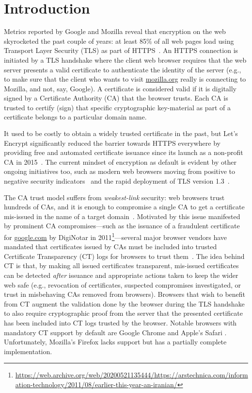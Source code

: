 \section{Introduction} \label{sec:introduction}
Metrics reported by Google and Mozilla reveal that encryption on the web
skyrocketed the past couple of years: at least 85\% of all web pages load using
Transport Layer Security (TLS) as part of
HTTPS~\cite{google-metrics,mozilla-metrics}. An HTTPS connection is initiated by
a TLS handshake where the client web browser requires that the web server
presents a valid certificate to authenticate the identity of the server (e.g.,
to make sure that the client who wants to visit \url{mozilla.org} really is
connecting to Mozilla, and not, say, Google). A certificate is considered valid
if it is digitally signed by a Certificate Authority (CA) that the browser
trusts. Each CA is trusted to certify (sign) that specific cryptographic
key-material as part of a certificate belongs to a particular domain name.

It used to be costly to obtain a widely trusted certificate in the past, but
Let's Encrypt significantly reduced the barrier towards HTTPS everywhere by
providing free and automated certificate issuance since its launch as a
non-profit CA in 2015~\cite{le}. The current mindset of encryption as default is
evident by other ongoing initiatives too, such as modern web browsers moving
from positive to negative security indicators~\cite{chrome-ui,firefox-ui} and
the rapid deployment of TLS version 1.3~\cite{rapid-tls13}.

The CA trust model suffers from \emph{weakest-link} security: web browsers trust
hundreds of CAs, and it is enough to compromise a single CA to get a certificate
mis-issued in the name of a target domain~\cite{ca-ecosystem,https-sok}.
Motivated by this issue manifested by prominent CA compromises---such as the
issuance of a fraudulent certificate for \url{google.com} by DigiNotar in
2011\footnote{\url{https://web.archive.org/web/20200521135444/https://arstechnica.com/information-technology/2011/08/earlier-this-year-an-iranian/}}---several
major browser vendors have mandated that certificates issued by CAs must be
included into trusted Certificate Transparency (CT) logs for browsers to trust
them~\cite{ct/a,ct,ct/bis}. The idea behind CT is that, by making all issued
certificates transparent, mis-issued certificates can be detected \emph{after}
issuance and appropriate actions taken to keep the wider web safe (e.g.,
revocation of certificates, suspected compromises investigated, or trust in
misbehaving CAs removed from browsers). Browsers that wish to benefit from CT
augment the validation done by the browser during the TLS handshake to also
require cryptographic proof from the server that the presented certificate has
been included into CT logs trusted by the browser. Notable browsers with
mandatory CT support by default are Google Chrome and Apple's Safari
\cite{chrome-policy,safari-policy}. Unfortunately, Mozilla's Firefox lacks
support but has a partially complete implementation.

